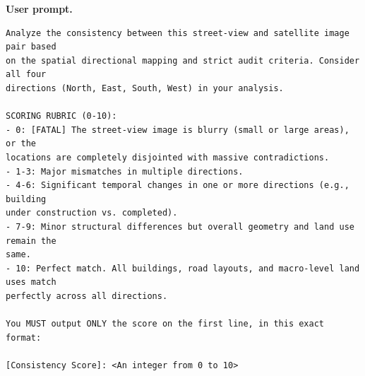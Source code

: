 \noindent\textbf{User prompt.}\par
\begingroup\fontsize{8}{10}\selectfont
\begin{promptbox}
\begin{verbatim}
Analyze the consistency between this street-view and satellite image pair based
on the spatial directional mapping and strict audit criteria. Consider all four
directions (North, East, South, West) in your analysis.

SCORING RUBRIC (0-10):
- 0: [FATAL] The street-view image is blurry (small or large areas), or the
locations are completely disjointed with massive contradictions.
- 1-3: Major mismatches in multiple directions.
- 4-6: Significant temporal changes in one or more directions (e.g., building
under construction vs. completed).
- 7-9: Minor structural differences but overall geometry and land use remain the
same.
- 10: Perfect match. All buildings, road layouts, and macro-level land uses match
perfectly across all directions.

You MUST output ONLY the score on the first line, in this exact format:

[Consistency Score]: <An integer from 0 to 10>
\end{verbatim}
\end{promptbox}
\endgroup

